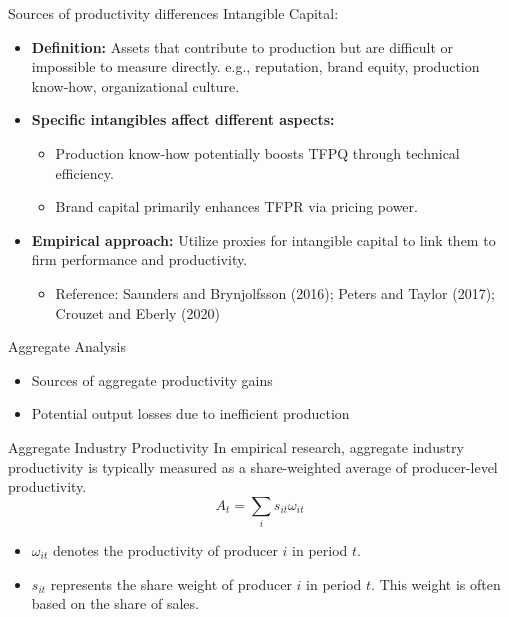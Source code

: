 \documentclass[aspectratio=169]{beamer}  %
\begin{document}
\begin{frame}{Sources of productivity differences}
    Intangible Capital: 
    \begin{itemize}
        \item \textbf{Definition:} Assets that contribute to production but are difficult or impossible to measure directly. e.g., reputation, brand equity, production know-how, organizational culture.
        \item \textbf{Specific intangibles affect different aspects:}
        \begin{itemize}
            \item Production know-how potentially boosts TFPQ through technical efficiency.
            \item Brand capital primarily enhances TFPR via pricing power.
        \end{itemize}
        \item \textbf{Empirical approach:} Utilize proxies for intangible capital to link them to firm performance and productivity.\\
        \begin{itemize}
            \item Reference: Saunders and Brynjolfsson (2016); Peters and Taylor (2017); Crouzet and Eberly (2020)
        \end{itemize}
    \end{itemize}
\end{frame}



\begin{frame}{Aggregate Analysis}
    \begin{itemize}
        \item Sources of aggregate productivity gains
        \item Potential output losses due to inefficient production
    \end{itemize}
\end{frame}


\begin{frame}{Aggregate Industry Productivity}
    In empirical research, aggregate industry productivity is typically measured as a share-weighted average of producer-level productivity.
    \[
    A_t = \sum_i s_{it} \omega_{it}
    \]
    \begin{itemize}
        \item \( \omega_{it} \) denotes the productivity of producer \( i \) in period \( t \).
        \item \( s_{it} \) represents the share weight of producer \( i \) in period \( t \). This weight is often based on the share of sales.
    \end{itemize}
\end{frame}
\end{document}

